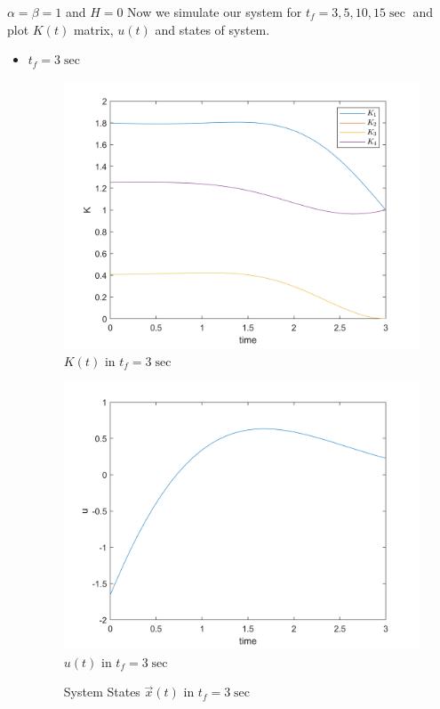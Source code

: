 $\alpha = \beta = 1$ and $H = 0$
Now we simulate our system for $t_f = 3, 5, 10, 15\sec$ and plot $K(t)$ matrix, $u(t)$ and states of system.

\begin{itemize}
	\item $t_f = 3\sec$
	\begin{figure}[H]
		\caption{$K(t)$ in $t_f = 3\sec$}
		\centering
		\includegraphics[width=12cm]{../Code/Q3/figures/K3.png}
	\end{figure}
\begin{figure}[H]
	\caption{$u(t)$ in $t_f = 3\sec$}
	\centering
	\includegraphics[width=12cm]{../Code/Q3/figures/u3.png}
\end{figure}
\begin{figure}[H]
	\caption{System States $\vec x(t)$ in $t_f = 3\sec$}
	\centering

\end{figure}
\end{itemize}
